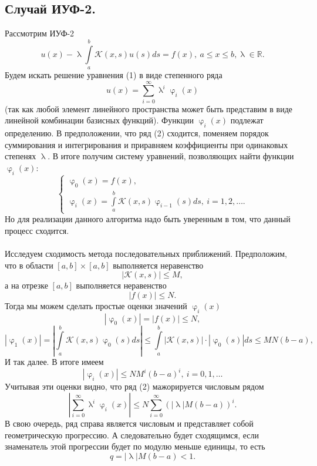\documentclass[a4paper, 12pt]{report}
\numberwithin{equation}{section}
\newcommand{\Rm}{\mathbb{R}}
\renewcommand{\leq}{\leqslant}
\renewcommand{\varphi}{\upvarphi}
\renewcommand{\lambda}{\uplambda}
\begin{document}
 	\subsection{Случай ИУФ-2.}
 	Рассмотрим ИУФ-2 
 	\begin{equation}
 		u(x) - \lambda \int\limits_a^b \mathcal K(x,s)u(s)ds = f(x),\ a\leq x \leq b, \lambda \in \Rm.
 	\end{equation}
 	Будем искать решение уравнения (1) в виде степенного ряда \begin{equation}
 		u(x) = \sum_{i=0}^{\infty} \lambda^i\varphi_i(x)
 	\end{equation}
 	(так как любой элемент линейного пространства может быть представим в виде линейной комбинации базисных функций). Функции $\varphi_i(x)$ подлежат определению. 
 	В предположении, что ряд (2) сходится, поменяем порядок суммирования и интегрирования и приравняем коэффициенты при одинаковых степенях $\lambda$. В итоге получим систему уравнений, позволяющих найти функции $\varphi_i(x)$:
 	\begin{equation}
 		\begin{cases}
 		\varphi_0(x) = f(x),\\
 		\varphi_i(x) = \int\limits_a^b \mathcal K(x,s)\varphi_{i-1}(s)ds,\ i=1,2,\ldots.
 	\end{cases}
 	\end{equation}
	Но для реализации данного алгоритма надо быть уверенным в том, что данный процесс сходится.\\\\
	Исследуем сходимость метода последовательных приближений. Предположим, что в области $[a,b]\times[a,b]$ выполняется неравенство $$|\mathcal K(x,s)|\leq M,$$
	а на отрезке $[a,b]$ выполняется неравенство $$|f(x)|\leq N.$$
	Тогда мы можем сделать простые оценки значений $\varphi_i(x)$
	$$|\varphi_0(x)| = |f(x)| \leq N,$$
	$$|\varphi_1(x)| = \left|\int\limits_a^b \mathcal K(x,s)\varphi_0(s)ds\right|\leq \int\limits_a^b |\mathcal K(x,s)|\cdot|\varphi_0(s)|ds \leq MN(b-a),$$
	И так далее. В итоге имеем
	$$|\varphi_i(x)| \leq NM^i (b-a)^i,\ i=0,1,\ldots$$
	Учитывая эти оценки видно, что ряд (2) мажорируется числовым рядом $$\left|\sum_{i=0}^{\infty} \lambda^i\varphi_i(x)\right|\leq N \sum_{i=0}^{\infty} \left(|\lambda| M(b-a)\right)^i.$$
	В свою очередь, ряд справа является числовым и представляет собой геометрическую прогрессию. А следовательно будет сходящимся, если знаменатель этой прогрессии будет по модулю меньше единицы, то есть
	\begin{equation}
		q = |\lambda| M(b-a) < 1.
	\end{equation}
\end{document}
